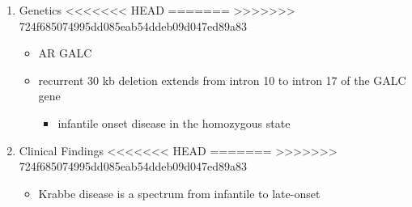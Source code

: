 \documentclass[fontsize=12pt]{scrartcl}
\begin{document}
\begin{enumerate}
\begin{enumerate}
\begin{enumerate}
\begin{enumerate}
\begin{table}[htbp]
\begin{enumerate}
\begin{enumerate}
\begin{table}[htbp]
\begin{enumerate}
\begin{itemize}
\begin{itemize}
\begin{enumerate}
\begin{enumerate}
\begin{enumerate}
\begin{itemize}
\item galactocerebrosidase is a lysosomal enzyme
\item hydrolyzes the galactose ester bonds of galactocerebroside, galactosylsphingosine, lactosylceramide, and monogalactosyldiglyceride
\item requires saposin A cofactor
\item lysosomal trafficking of galactocerebrosidase by the M6P receptor
\item enzyme is secreted in ML II (I cell disease)
\end{itemize}

\begin{enumerate}
\item Saposin A cofactor deficiency
<<<<<<< HEAD
\label{sec:org55762c2}
=======
\label{sec:orgec552b9}
>>>>>>> 724f685074995dd085eab54ddeb09d047ed89a83
\begin{itemize}
\item atypical Krabbe disease due to saposin A deficiency is caused by mutation in the prosaposin gene (PSAP)
\item sphingolipid activator proteins (saposins A, B, C and D) are small
homologous glycoproteins derived from a common precursor protein
(prosaposin) encoded by a single gene
\item they are required for \emph{in vivo} degradation of sphingolipids with
short carbohydrate chains
\end{itemize}
\end{enumerate}

\item Genetics
<<<<<<< HEAD
\label{sec:org014a1df}
=======
\label{sec:orgb0fa0d5}
>>>>>>> 724f685074995dd085eab54ddeb09d047ed89a83
\begin{itemize}
\item AR GALC
\item recurrent 30 kb deletion extends from intron 10 to intron 17 of the GALC gene
\begin{itemize}
\item infantile onset disease in the homozygous state
\end{itemize}
\end{itemize}

\item Clinical Findings
<<<<<<< HEAD
\label{sec:orgf19025f}
=======
\label{sec:org1a85d35}
>>>>>>> 724f685074995dd085eab54ddeb09d047ed89a83
\begin{itemize}
\item Krabbe disease is a spectrum from infantile to late-onset


\end{itemize}
\end{enumerate}
\end{enumerate}
\end{enumerate}
\end{itemize}
\end{itemize}
\end{enumerate}
\end{table}
\end{enumerate}
\end{enumerate}
\end{table}
\end{enumerate}
\end{enumerate}
\end{enumerate}
\end{enumerate}
\end{document}
